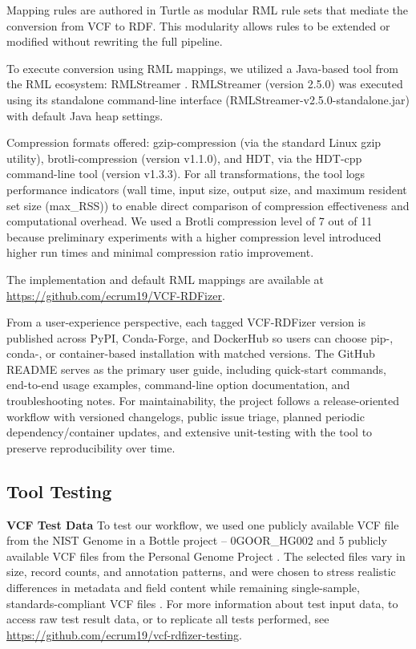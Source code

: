 \documentclass[unnumsec,webpdf,contemporary,large]{oup-authoring-template}
\begin{document}
Mapping rules are authored in Turtle as modular RML rule sets that mediate the conversion from VCF to RDF. 
This modularity allows rules to be extended or modified without rewriting the full pipeline. 

To execute conversion using RML mappings, we utilized a Java-based tool from the RML ecosystem: RMLStreamer \cite{rmlstreamer_2022}. 
RMLStreamer (version 2.5.0) was executed using its standalone command-line interface (RMLStreamer-v2.5.0-standalone.jar) with default Java heap settings. 

Compression formats offered: gzip-compression (via the standard Linux gzip utility), brotli-compression \cite{brotli_2019} (version v1.1.0), and HDT, via the HDT-cpp command-line tool \cite{hdt_2013} (version v1.3.3). 
For all transformations, the tool logs performance indicators (wall time, input size, output size, and maximum resident set size (max\_RSS)) to enable direct comparison of compression effectiveness and computational overhead.
We used a Brotli compression level of 7 out of 11 because preliminary experiments with a higher compression level introduced higher run times and minimal compression ratio improvement.

The implementation and default RML mappings are available at \url{https://github.com/ecrum19/VCF-RDFizer}. 

From a user-experience perspective, each tagged VCF-RDFizer version is published across PyPI, Conda-Forge, and DockerHub so users can choose pip-, conda-, or container-based installation with matched versions.
The GitHub README serves as the primary user guide, including quick-start commands, end-to-end usage examples, command-line option documentation, and troubleshooting notes.
For maintainability, the project follows a release-oriented workflow with versioned changelogs, public issue triage, planned periodic dependency/container updates, and extensive unit-testing with the tool to preserve reproducibility over time.

\subsection{Tool Testing}\label{subsec2.3}

\textbf{VCF Test Data}
To test our workflow, we used one publicly available VCF file from the NIST Genome in a Bottle project -- 0GOOR\_HG002 \cite{nist_gib_2025} and 5 publicly available VCF files from the Personal Genome Project \cite{personal_genome_proj}.
The selected files vary in size, record counts, and annotation patterns, and were chosen to stress realistic differences in metadata and field content while remaining single-sample, standards-compliant VCF files \cite{vcf_spec_2024}.
For more information about test input data, to access raw test result data, or to replicate all tests performed, see \url{https://github.com/ecrum19/vcf-rdfizer-testing}.
\end{document}

